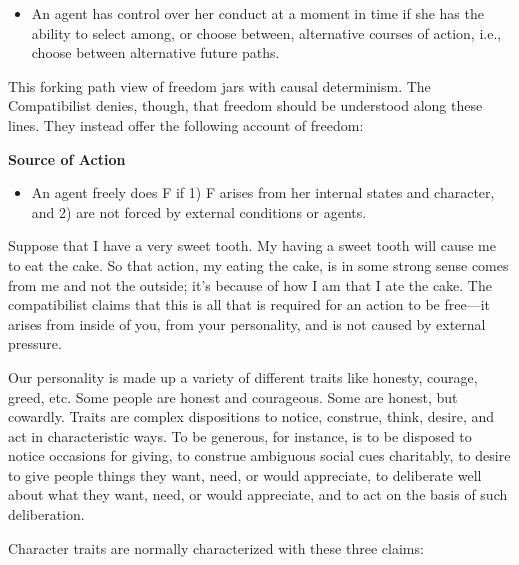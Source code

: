 \documentclass[]{article}
\begin{document}
\begin{itemize}
\itemsep1pt\parskip0pt
\item
  An agent has control over her conduct at a moment in time if she has
  the ability to select among, or choose between, alternative courses of
  action, i.e., choose between alternative future paths.
\end{itemize}

This forking path view of freedom jars with causal determinism. The
Compatibilist denies, though, that freedom should be understood along
these lines. They instead offer the following account of freedom:

\textbf{Source of Action}

\begin{itemize}
\itemsep1pt\parskip0pt
\item
  An agent freely does F if 1) F arises from her internal states and
  character, and 2) are not forced by external conditions or agents.
\end{itemize}

Suppose that I have a very sweet tooth. My having a sweet tooth will
cause me to eat the cake. So that action, my eating the cake, is in some
strong sense comes from me and not the outside; it's because of how I am
that I ate the cake. The compatibilist claims that this is all that is
required for an action to be free---it arises from inside of you, from
your personality, and is not caused by external pressure.

Our personality is made up a variety of different traits like honesty,
courage, greed, etc. Some people are honest and courageous. Some are
honest, but cowardly. Traits are complex dispositions to notice,
construe, think, desire, and act in characteristic ways. To be generous,
for instance, is to be disposed to notice occasions for giving, to
construe ambiguous social cues charitably, to desire to give people
things they want, need, or would appreciate, to deliberate well about
what they want, need, or would appreciate, and to act on the basis of
such deliberation.

Character traits are normally characterized with these three claims:
\end{document}
